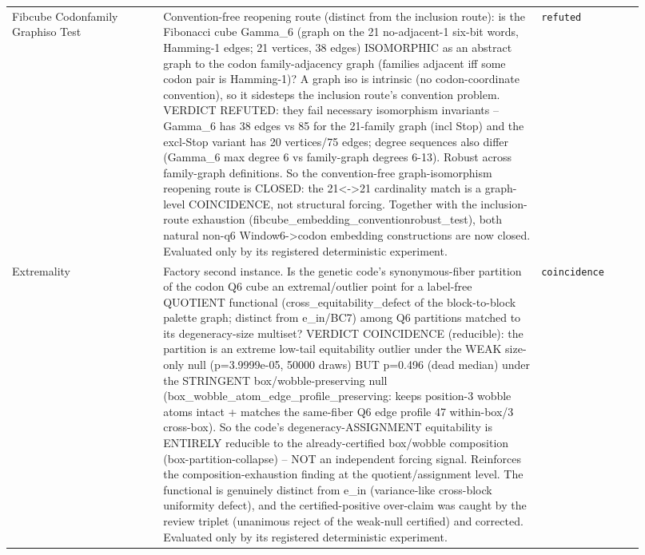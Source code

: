 \begin{longtable}{>{\raggedright\arraybackslash}p{0.22\linewidth}>{\raggedright\arraybackslash}p{0.55\linewidth}>{\raggedright\arraybackslash}p{0.15\linewidth}}
Fibcube Codonfamily Graphiso Test & Convention-free reopening route (distinct from the inclusion route): is the Fibonacci cube Gamma\_6 (graph on the 21 no-adjacent-1 six-bit words, Hamming-1 edges; 21 vertices, 38 edges) ISOMORPHIC as an abstract graph to the codon family-adjacency graph (families adjacent iff some codon pair is Hamming-1)? A graph iso is intrinsic (no codon-coordinate convention), so it sidesteps the inclusion route's convention problem. VERDICT REFUTED: they fail necessary isomorphism invariants -- Gamma\_6 has 38 edges vs 85 for the 21-family graph (incl Stop) and the excl-Stop variant has 20 vertices/75 edges; degree sequences also differ (Gamma\_6 max degree 6 vs family-graph degrees 6-13). Robust across family-graph definitions. So the convention-free graph-isomorphism reopening route is CLOSED: the 21<->21 cardinality match is a graph-level COINCIDENCE, not structural forcing. Together with the inclusion-route exhaustion (fibcube\_embedding\_conventionrobust\_test), both natural non-q6 Window6->codon embedding constructions are now closed. Evaluated only by its registered deterministic experiment. & \texttt{refuted} \\
Extremality & Factory second instance. Is the genetic code's synonymous-fiber partition of the codon Q6 cube an extremal/outlier point for a label-free QUOTIENT functional (cross\_equitability\_defect of the block-to-block palette graph; distinct from e\_in/BC7) among Q6 partitions matched to its degeneracy-size multiset? VERDICT COINCIDENCE (reducible): the partition is an extreme low-tail equitability outlier under the WEAK size-only null (p=3.9999e-05, 50000 draws) BUT p=0.496 (dead median) under the STRINGENT box/wobble-preserving null (box\_wobble\_atom\_edge\_profile\_preserving: keeps position-3 wobble atoms intact + matches the same-fiber Q6 edge profile 47 within-box/3 cross-box). So the code's degeneracy-ASSIGNMENT equitability is ENTIRELY reducible to the already-certified box/wobble composition (box-partition-collapse) -- NOT an independent forcing signal. Reinforces the composition-exhaustion finding at the quotient/assignment level. The functional is genuinely distinct from e\_in (variance-like cross-block uniformity defect), and the certified-positive over-claim was caught by the review triplet (unanimous reject of the weak-null certified) and corrected. Evaluated only by its registered deterministic experiment. & \texttt{coincidence} \\

\end{longtable}
